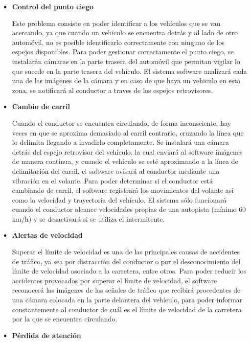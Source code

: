 \begin{itemize}[-]
\item \textbf{Control del punto ciego}
\par Este problema consiste en poder identificar a los vehículos que se van acercando, ya que cuando un vehículo se encuentra detrás y al lado de otro automóvil, no es posible identificarlo correctamente con ninguno de los espejos disponibles. Para poder gestionar correctamente el punto ciego, se instalarán cámaras en la parte trasera del automóvil que permitan vigilar lo que sucede en la parte trasera del vehículo. El sistema software analizará cada una de las imágenes de la cámara y en caso de que haya un vehiculo en esta zona, se notificará al conductor a traves de los espejos retrovisores. 
\item \textbf{Cambio de carril}
\par Cuando el conductor se encuentra circulando, de forma inconsciente, hay veces en que se aproxima demasiado al carril contrario, cruzando la línea que lo delimita llegando a invadirlo completamente. Se instalará una cámara detrás del espejo retrovisor del vehículo, la cual enviará al software imágenes de manera continua, y cuando el vehículo se esté aproximando a la línea de delimitación del carril, el software avisará al conductor mediante una vibración en el volante. Para poder determinar si el conductor está cambiando de carril, el software registrará los movimientos del volante así como la velocidad y trayectoria del vehículo. El sistema sólo funcionará cuando el conductor alcance velocidades propias de una autopista (mínimo 60 km/h) y se desactivará si se utiliza el intermitente.
\item \textbf{Alertas de velocidad}
\par Superar el límite de velocidad es una de las principales causas de accidentes de tráfico, ya sea por distracción del conductor o por el desconocimiento del límite de velocidad asociado a la carretera, entre otros. Para poder reducir los accidentes provocados por superar el límite de velocidad, el software reconocerá las imágenes de las señales de tráfico que recibirá procedentes de una cámara colocada en la parte delantera del vehículo, para poder informar constantemente al conductor de cuál es el límite de velocidad de la carretera por la que se encuentra circulando.
\item \textbf{Pérdida de atención}

\end{itemize}
